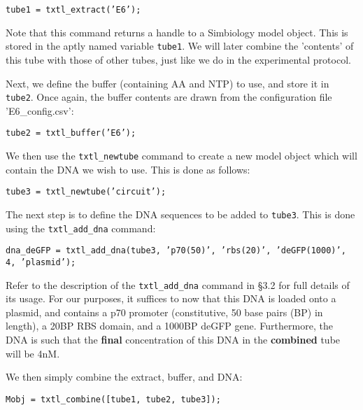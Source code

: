 \documentclass[english]{report}
\begin{document}
				\begin{flushleft}
						\texttt{tube1 = txtl\_extract('E6');} 
				\end{flushleft}	
				
				Note that this command returns a handle to a Simbiology model object. This is stored in the aptly named variable \texttt{tube1}. We will later combine the 'contents' of this tube with those of other tubes, just like we do in the experimental protocol. 
				
Next, we define the buffer (containing AA and NTP) to use, and store it in \texttt{tube2}. Once again, the buffer contents are drawn from the configuration file \textsf{'E6\_config.csv'}:

				\begin{flushleft}
						\texttt{tube2 = txtl\_buffer('E6');} \\	
				\end{flushleft}	 
		
We then use the \texttt{txtl\_newtube} command to create a new model object which will contain the DNA we wish to use. This is done as follows:
		
				\begin{flushleft}
						\texttt{tube3 = txtl\_newtube('circuit');} \\	
				\end{flushleft}	 
				
The next step is to define the DNA sequences to be added to \texttt{tube3}. This is done using the \texttt{txtl\_add\_dna} command:

				\begin{flushleft}
						\texttt{dna\_deGFP = txtl\_add\_dna(tube3, 'p70(50)', 'rbs(20)', 'deGFP(1000)', 4, 'plasmid');} \\	
				\end{flushleft}
Refer to the description of the \texttt{txtl\_add\_dna} command in \S 3.2 for full details of its usage. For our purposes, it suffices to now that this DNA is loaded onto a plasmid, and contains a p70 promoter (constitutive, 50 base pairs (BP) in length), a 20BP RBS domain, and a 1000BP deGFP gene. Furthermore, the DNA is such that the \textbf{final} concentration of this DNA in the \textbf{combined} tube will be 4{\color{red}nM}. 

We then simply combine the extract, buffer, and DNA:

				\begin{flushleft}
						\texttt{Mobj = txtl\_combine([tube1, tube2, tube3]);} \\	
				\end{flushleft}
							
\end{document}

